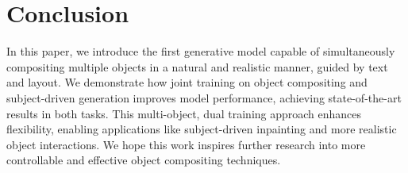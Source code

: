 \vspace{-2mm}
\section{Conclusion}
\label{sec:conclusion}
\vspace{-1mm}
In this paper, we introduce the first generative model capable of simultaneously compositing multiple objects in a natural and realistic manner, guided by text and layout. We demonstrate how joint training on object compositing and subject-driven generation improves model performance, achieving state-of-the-art results in both tasks. This multi-object, dual training approach enhances flexibility, enabling applications like subject-driven inpainting and more realistic object interactions. We hope this work inspires further research into more controllable and effective object compositing techniques.